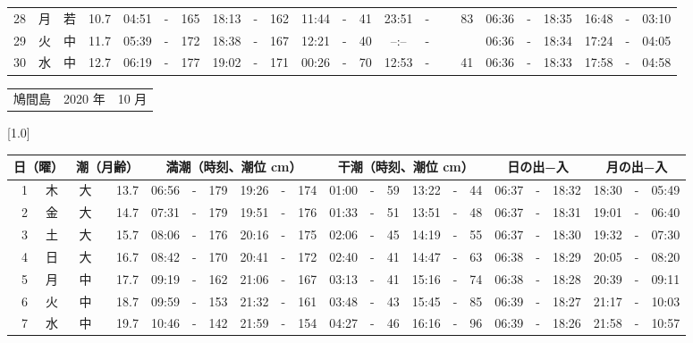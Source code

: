 \documentclass[12pt,a4j]{jsarticle}
\begin{document}
\begin{table}[htbp]
\begin{center}
{\begin{tabular}{|rc|cr|ccrccr|ccrccr|ccc|ccc|}
28 & 月 & 若 & 10.7 &  04:51 &-& 165 &  18:13 &-& 162 &  11:44 &-&  41 &  23:51 &-&  83 & 06:36 & -& 18:35 & 16:48 & -& 03:10 \\
29 & 火 & 中 & 11.7 &  05:39 &-& 172 &  18:38 &-& 167 &  12:21 &-&  40 &  --:-- &-&~~~~~ & 06:36 & -& 18:34 & 17:24 & -& 04:05 \\
30 & 水 & 中 & 12.7 &  06:19 &-& 177 &  19:02 &-& 171 &  00:26 &-&  70 &  12:53 &-&  41 & 06:36 & -& 18:33 & 17:58 & -& 04:58 \\
   \hline
   \end{tabular}}
   \end{center}
\end{table}
\newpage
 \begin{table}[htbp]
 \begin{center}
 \begin{tabular}{lcc}
 \LARGE{鳩間島}  & \large{2020 年} & \large{10 月} \\
 \end{tabular}
 \end{center}
 \begin{center}
    \scalebox{0.7}[1.0]{
    \begin{tabular}{|rc|cr|ccrccr|ccrccr|ccc|ccc|}
    \hline
    \multicolumn{2}{|c|}{日（曜）} & \multicolumn{2}{c|}{潮（月齢）} & \multicolumn{6}{c|}{満潮（時刻、潮位 cm）} & \multicolumn{6}{c|}{干潮（時刻、潮位 cm）} & \multicolumn{3}{c|}{日の出−入} &  \multicolumn{3}{c|}{月の出−入}\\
 \hline
 1 & 木 & 大 & 13.7 &  06:56 &-& 179 &  19:26 &-& 174 &  01:00 &-&  59 &  13:22 &-&  44 & 06:37 & -& 18:32 & 18:30 & -& 05:49 \\
 2 & 金 & 大 & 14.7 &  07:31 &-& 179 &  19:51 &-& 176 &  01:33 &-&  51 &  13:51 &-&  48 & 06:37 & -& 18:31 & 19:01 & -& 06:40 \\
 3 & 土 & 大 & 15.7 &  08:06 &-& 176 &  20:16 &-& 175 &  02:06 &-&  45 &  14:19 &-&  55 & 06:37 & -& 18:30 & 19:32 & -& 07:30 \\
 4 & 日 & 大 & 16.7 &  08:42 &-& 170 &  20:41 &-& 172 &  02:40 &-&  41 &  14:47 &-&  63 & 06:38 & -& 18:29 & 20:05 & -& 08:20 \\
 5 & 月 & 中 & 17.7 &  09:19 &-& 162 &  21:06 &-& 167 &  03:13 &-&  41 &  15:16 &-&  74 & 06:38 & -& 18:28 & 20:39 & -& 09:11 \\
 6 & 火 & 中 & 18.7 &  09:59 &-& 153 &  21:32 &-& 161 &  03:48 &-&  43 &  15:45 &-&  85 & 06:39 & -& 18:27 & 21:17 & -& 10:03 \\
 7 & 水 & 中 & 19.7 &  10:46 &-& 142 &  21:59 &-& 154 &  04:27 &-&  46 &  16:16 &-&  96 & 06:39 & -& 18:26 & 21:58 & -& 10:57 \\

\end{tabular}}
\end{center}
\end{table}
\end{document}
